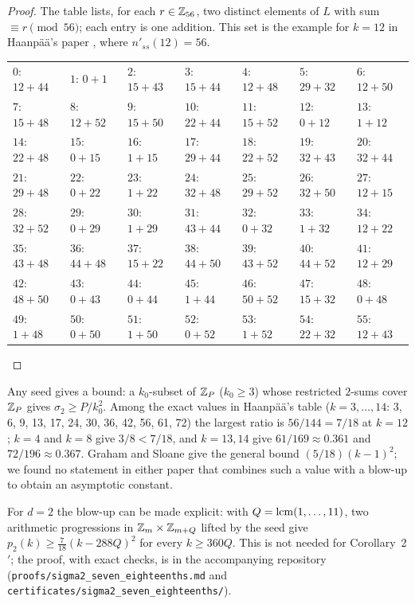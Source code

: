 \begin{proof}
The table lists, for each $r \in \mathbb{Z}_{56}$, two distinct elements of $L$ with sum $\equiv r \pmod{56}$;
each entry is one addition. This set is the example for $k = 12$ in Haanp\"a\"a's paper \cite{Haanpaa}, where
$n'_{ss}(12) = 56$.
\begin{center}\scriptsize
\begin{tabular}{lllllll}
$0$: $12+44$ & $1$: $0+1$ & $2$: $15+43$ & $3$: $15+44$ & $4$: $12+48$ & $5$: $29+32$ & $6$: $12+50$\\
$7$: $15+48$ & $8$: $12+52$ & $9$: $15+50$ & $10$: $22+44$ & $11$: $15+52$ & $12$: $0+12$ & $13$: $1+12$\\
$14$: $22+48$ & $15$: $0+15$ & $16$: $1+15$ & $17$: $29+44$ & $18$: $22+52$ & $19$: $32+43$ & $20$: $32+44$\\
$21$: $29+48$ & $22$: $0+22$ & $23$: $1+22$ & $24$: $32+48$ & $25$: $29+52$ & $26$: $32+50$ & $27$: $12+15$\\
$28$: $32+52$ & $29$: $0+29$ & $30$: $1+29$ & $31$: $43+44$ & $32$: $0+32$ & $33$: $1+32$ & $34$: $12+22$\\
$35$: $43+48$ & $36$: $44+48$ & $37$: $15+22$ & $38$: $44+50$ & $39$: $43+52$ & $40$: $44+52$ & $41$: $12+29$\\
$42$: $48+50$ & $43$: $0+43$ & $44$: $0+44$ & $45$: $1+44$ & $46$: $50+52$ & $47$: $15+32$ & $48$: $0+48$\\
$49$: $1+48$ & $50$: $0+50$ & $51$: $1+50$ & $52$: $0+52$ & $53$: $1+52$ & $54$: $22+32$ & $55$: $12+43$
\end{tabular}
\end{center}

\end{proof}

\begin{remark}[Why $12$]
Any seed gives a bound: a $k_0$-subset of $\mathbb{Z}_P$ ($k_0 \ge 3$) whose restricted $2$-sums cover $\mathbb{Z}_P$ gives
$\sigma_2 \ge P/k_0^2$. Among the exact values in
Haanp\"a\"a's table \cite{Haanpaa} ($k = 3, \dots, 14$: 3, 6, 9, 13, 17, 24, 30, 36, 42, 56, 61, 72) the largest
ratio is $56/144 = 7/18$ at $k = 12$; $k = 4$ and $k = 8$ give $3/8 < 7/18$, and $k = 13, 14$ give
$61/169 \approx 0.361$ and $72/196 \approx 0.367$. Graham and Sloane \cite{GS} give the general bound $(5/18)(k-1)^2$; we found no statement in
either paper that combines such a value with a blow-up to obtain an asymptotic constant.
\end{remark}

\begin{remark}
For $d = 2$ the blow-up can be made explicit: with $Q = \operatorname{lcm}(1, \dots, 11)$, two arithmetic progressions in
$\mathbb{Z}_m \times \mathbb{Z}_{m+Q}$ lifted by the seed give $p_2(k) \ge \frac{7}{18}(k - 288Q)^2$ for every $k \ge 360Q$. This is
not needed for Corollary~2$'$; the proof, with exact checks, is in the accompanying repository
(\texttt{proofs/\allowbreak sigma2\_\allowbreak seven\_\allowbreak eighteenths.md} and \texttt{certificates/\allowbreak sigma2\_\allowbreak seven\_\allowbreak eighteenths/}).
\end{remark}

